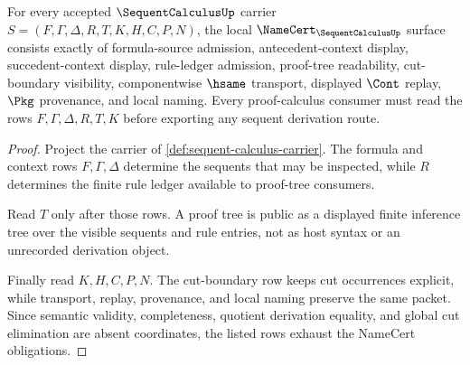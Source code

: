 \begin{theorem}
\label{thm:sequent-calculus-namecert-obligations}
For every accepted $\SequentCalculusUp$ carrier $S=(F,\Gamma,\Delta,R,T,K,H,C,P,N)$, the local $\NameCert_{\SequentCalculusUp}$ surface consists exactly of formula-source admission, antecedent-context display, succedent-context display, rule-ledger admission, proof-tree readability, cut-boundary visibility, componentwise $\hsame$ transport, displayed $\Cont$ replay, $\Pkg$ provenance, and local naming. Every proof-calculus consumer must read the rows $F,\Gamma,\Delta,R,T,K$ before exporting any sequent derivation route.
\end{theorem}
\begin{proof}
Project the carrier of \autoref{def:sequent-calculus-carrier}. The formula and context rows $F,\Gamma,\Delta$ determine the sequents that may be inspected, while $R$ determines the finite rule ledger available to proof-tree consumers.

Read $T$ only after those rows. A proof tree is public as a displayed finite inference tree over the visible sequents and rule entries, not as host syntax or an unrecorded derivation object.

Finally read $K,H,C,P,N$. The cut-boundary row keeps cut occurrences explicit, while transport, replay, provenance, and local naming preserve the same packet. Since semantic validity, completeness, quotient derivation equality, and global cut elimination are absent coordinates, the listed rows exhaust the NameCert obligations.
\end{proof}

